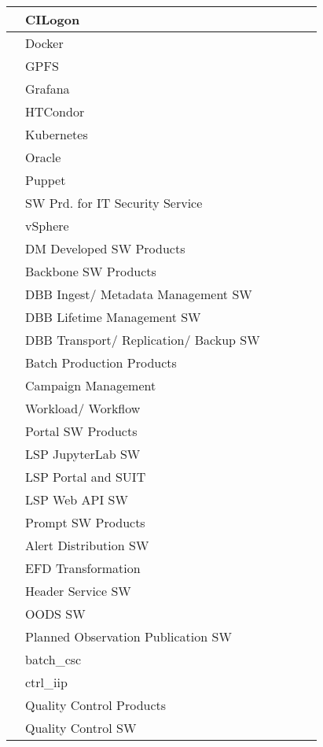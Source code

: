 \begin{longtable}{|p{}|p{}|p{}|p{}|p{}|p{}|}
 &  CILogon &  &  &  & \\ \hline
 &  Docker &  &  &  & \\ \hline
 &  GPFS &  &  &  & \\ \hline
 &  Grafana &  &  &  & \\ \hline
 &  HTCondor &  &  &  & \\ \hline
 &  Kubernetes &  &  &  & \\ \hline
 &  Oracle &  &  &  & \\ \hline
 &  Puppet &  &  &  & \\ \hline
 &  SW Prd. for IT Security Service &  &  &  & \\ \hline
 &  vSphere &  &  &  & \\ \hline
 &  DM Developed SW Products &  &  &  & \\ \hline
 &  Backbone SW Products &  &  &  & \\ \hline
 &  DBB Ingest/ Metadata Management SW &  &  &  & \\ \hline
 &  DBB Lifetime Management SW &  &  &  & \\ \hline
 &  DBB Transport/ Replication/ Backup SW &  &  &  & \\ \hline
 &  Batch Production Products &  &  &  & \\ \hline
 &  Campaign Management &  &  &  & \\ \hline
 &  Workload/ Workflow &  &  &  & \\ \hline
 &  Portal SW Products &  &  &  & \\ \hline
 &  LSP JupyterLab SW &  &  &  & \\ \hline
 &  LSP Portal and SUIT &  &  &  & \\ \hline
 &  LSP Web API SW &  &  &  & \\ \hline
 &  Prompt SW Products &  &  &  & \\ \hline
 &  Alert Distribution SW &  &  &  & \\ \hline
 &  EFD Transformation &  &  &  & \\ \hline
 &  Header Service SW &  &  &  & \\ \hline
 &  OODS SW &  &  &  & \\ \hline
 &  Planned Observation Publication SW &  &  &  & \\ \hline
 &  batch\_csc &  &  &  & \\ \hline
 &  ctrl\_iip &  &  &  & \\ \hline
 &  Quality Control Products &  &  &  & \\ \hline
 &  Quality Control SW &  &  &  & \\ \hline

\end{longtable}
